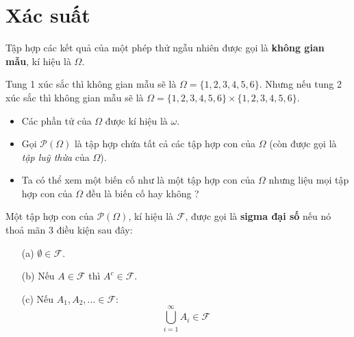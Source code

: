 

\section{Xác suất}


\begin{defivn}
    Tập hợp các kết quả của một phép thử ngẫu nhiên được gọi là \textbf{không gian mẫu}, kí hiệu là $\Omega$.
\end{defivn}

\begin{egvn}
    Tung 1 xúc sắc thì không gian mẫu sẽ là $\Omega = \{1, 2, 3, 4, 5, 6\}$. Nhưng nếu tung 2 xúc sắc thì không gian mẫu sẽ là $\Omega = \{1, 2, 3, 4, 5, 6\} \times \{1, 2, 3, 4, 5, 6\}$.
\end{egvn}

\begin{itemize}
    \item Các phần tử của $\Omega$ được kí hiệu là $\omega$.
    
    \item Gọi $\mathcal{P}(\Omega)$ là tập hợp chứa tất cả các tập hợp con của $\Omega$ (còn được gọi là \textit{tập luỹ thừa} của $\Omega$).
    
    \item Ta có thể xem một biến cố như là một tập hợp con của $\Omega$ nhưng liệu mọi tập hợp con của $\Omega$ đều là biến cố hay không ?
\end{itemize}

\begin{defivn}
    Một tập hợp con của $\mathcal{P}(\Omega)$, kí hiệu là $\mathcal{F}$, được gọi là \textbf{sigma đại số} nếu nó thoả mãn 3 điều kiện sau đây:
    \begin{itemize}
        \item[(a)] $\emptyset \in \mathcal{F}$.
        \item[(b)] Nếu $A \in \mathcal{F}$ thì $A^c \in \mathcal{F}$.
        \item[(c)] Nếu $A_1, A_2, ... \in \mathcal{F}$:
        $$
        \bigcup_{i=1}^{\infty} A_i \in \mathcal{F}
        $$
    \end{itemize}
\end{defivn}

